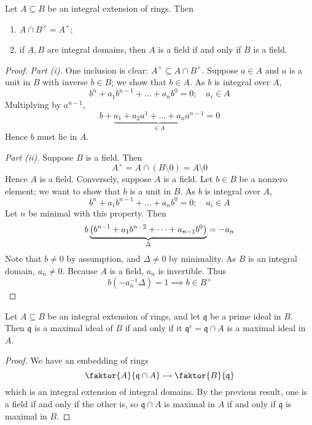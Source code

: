 \begin{lemma}
    Let \( A \subseteq B \) be an integral extension of rings.
    Then
    \begin{enumerate}
        \item \( A \cap B^\times = A^\times \);
        \item if \( A, B \) are integral domains, then \( A \) is a field if and only if \( B \) is a field.
    \end{enumerate}
\end{lemma}
\begin{proof}
    \emph{Part (i).}
    One inclusion is clear: \( A^\times \subseteq A \cap B^\times \).
    Suppose \( a \in A \) and \( a \) is a unit in \( B \) with inverse \( b \in B \); we show that \( b \in A \).
    As \( b \) is integral over \( A \),
    \[ b^n + a_1 b^{n-1} + \dots + a_n b^0 = 0;\quad a_i \in A \]
    Multiplying by \( a^{n-1} \),
    \[ b + \underbrace{a_1 + a_2 a^1 + \dots + a_n a^{n-1}}_{\in A} = 0 \]
    Hence \( b \) must lie in \( A \).

    \emph{Part (ii).}
    Suppose \( B \) is a field.
    Then
    \[ A^\times = A \cap (B \setminus \qty{0}) = A \setminus \qty{0} \]
    Hence \( A \) is a field.
    Conversely, suppose \( A \) is a field.
    Let \( b \in B \) be a nonzero element; we want to show that \( b \) is a unit in \( B \).
    As \( b \) is integral over \( A \),
    \[ b^n + a_1 b^{n-1} + \dots + a_n b^0 = 0;\quad a_i \in A \]
    Let \( n \) be minimal with this property.
    Then
    \[ b\underbrace{\qty(b^{n-1} + a_1 b^{n-2} + \dots + a_{n-1} b^0)}_{\Delta} = -a_n \]
    Note that \( b \neq 0 \) by assumption, and \( \Delta \neq 0 \) by minimality.
    As \( B \) is an integral domain, \( a_n \neq 0 \).
    Because \( A \) is a field, \( a_n \) is invertible.
    Thus
    \[ b(-a_n^{-1} \Delta) = 1 \implies b \in B^\times \]
\end{proof}
\begin{corollary}
    Let \( A \subseteq B \) be an integral extension of rings, and let \( \mathfrak q \) be a prime ideal in \( B \).
    Then \( \mathfrak q \) is a maximal ideal of \( B \) if and only if it \( \mathfrak q^c = \mathfrak q \cap A \) is a maximal ideal in \( A \).
\end{corollary}
\begin{proof}
    We have an embedding of rings
    \[ \faktor{A}{\mathfrak q \cap A} \rightarrowtail \faktor{B}{\mathfrak q} \]
    which is an integral extension of integral domains.
    By the previous result, one is a field if and only if the other is, so \( \mathfrak q \cap A \) is maximal in \( A \) if and only if \( \mathfrak q \) is maximal in \( B \).
\end{proof}

